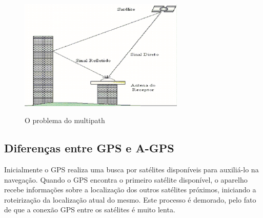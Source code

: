 \begin{figure}[H]
    \centering
    \caption{O problema do multipath}
    \includegraphics[width=0.7\textwidth]{./dados/figuras/fig3}
    \label{fig:figura-propagmultipath}
\end{figure}

\subsection{Diferenças entre GPS e A-GPS}


Inicialmente o GPS realiza uma busca por satélites disponíveis para auxiliá-lo na navegação. Quando o GPS encontra o primeiro satélite disponível, o aparelho recebe informações sobre a localização dos outros satélites próximos, iniciando a roteirização da localização atual do mesmo. Este processo é demorado, pelo fato de que a conexão GPS entre os satélites é muito lenta.


